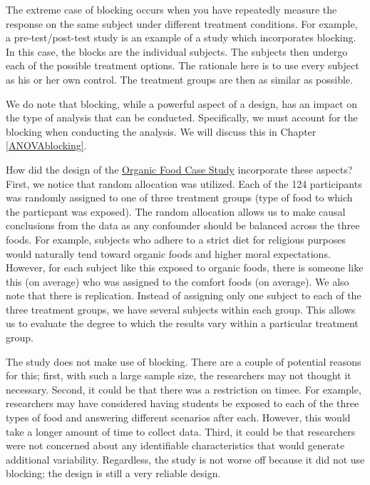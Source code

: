 \documentclass[]{book}
\theoremstyle{definition}
\theoremstyle{definition}
\theoremstyle{remark}
\begin{document}
The extreme case of blocking occurs when you have repeatedly measure the
response on the same subject under different treatment conditions. For
example, a pre-test/post-test study is an example of a study which
incorporates blocking. In this case, the blocks are the individual
subjects. The subjects then undergo each of the possible treatment
options. The rationale here is to use every subject as his or her own
control. The treatment groups are then as similar as possible.

We do note that blocking, while a powerful aspect of a design, has an
impact on the type of analysis that can be conducted. Specifically, we
must account for the blocking when conducting the analysis. We will
discuss this in Chapter \ref{ANOVAblocking}.

How did the design of the \protect\hyperlink{CaseOrganic}{Organic Food
Case Study} incorporate these aspects? First, we notice that random
allocation was utilized. Each of the 124 participants was randomly
assigned to one of three treatment groups (type of food to which the
particpant was exposed). The random allocation allows us to make causal
conclusions from the data as any confounder should be balanced across
the three foods. For example, subjects who adhere to a strict diet for
religious purposes would naturally tend toward organic foods and higher
moral expectations. However, for each subject like this exposed to
organic foods, there is someone like this (on average) who was assigned
to the comfort foods (on average). We also note that there is
replication. Instead of assigning only one subject to each of the three
treatment groups, we have several subjects within each group. This
allows us to evaluate the degree to which the results vary within a
particular treatment group.

The study does not make use of blocking. There are a couple of potential
reasons for this; first, with such a large sample size, the researchers
may not thought it necessary. Second, it could be that there was a
restriction on timee. For example, researchers may have considered
having students be exposed to each of the three types of food and
answering different scenarios after each. However, this would take a
longer amount of time to collect data. Third, it could be that
researchers were not concerned about any identifiable characteristics
that would generate additional variability. Regardless, the study is not
worse off because it did not use blocking; the design is still a very
reliable design.
\end{document}
